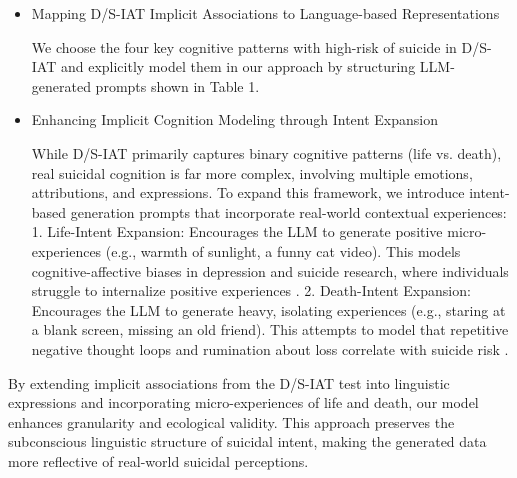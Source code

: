 \begin{itemize}
    \item Mapping D/S-IAT Implicit Associations to Language-based Representations
    
    We choose the four key cognitive patterns with high-risk of suicide in D/S-IAT and explicitly model them in our approach by structuring LLM-generated prompts shown in Table 1.

   \item Enhancing Implicit Cognition Modeling through Intent Expansion
   
   While D/S-IAT primarily captures binary cognitive patterns (life vs. death), real suicidal cognition is far more complex, involving multiple emotions, attributions, and expressions. To expand this framework, we introduce intent-based generation prompts that incorporate real-world contextual experiences:
   1. Life-Intent Expansion: Encourages the LLM to generate positive micro-experiences (e.g., warmth of sunlight, a funny cat video). This models cognitive-affective biases in depression and suicide research, where individuals struggle to internalize positive experiences \cite{method7}.
   2. Death-Intent Expansion: Encourages the LLM to generate heavy, isolating experiences (e.g., staring at a blank screen, missing an old friend). This attempts to model that repetitive negative thought loops and rumination about loss correlate with suicide risk \cite{method8}.


    
\end{itemize}
By extending implicit associations from the D/S-IAT test into linguistic expressions and incorporating micro-experiences of life and death, our model enhances granularity and ecological validity. This approach preserves the subconscious linguistic structure of suicidal intent, making the generated data more reflective of real-world suicidal perceptions.



